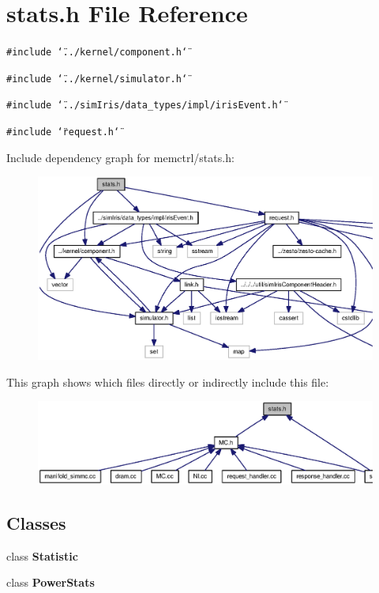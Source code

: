 \section{stats.h File Reference}
\label{memctrl_2stats_8h}
{\tt \#include \char`\"{}../kernel/component.h\char`\"{}}\par
{\tt \#include \char`\"{}../kernel/simulator.h\char`\"{}}\par
{\tt \#include \char`\"{}../simIris/data\_\-types/impl/irisEvent.h\char`\"{}}\par
{\tt \#include \char`\"{}request.h\char`\"{}}\par


Include dependency graph for memctrl/stats.h:\nopagebreak
\begin{figure}[H]
\begin{center}
\leavevmode
\includegraphics[width=420pt]{memctrl_2stats_8h__incl}
\end{center}
\end{figure}


This graph shows which files directly or indirectly include this file:\nopagebreak
\begin{figure}[H]
\begin{center}
\leavevmode
\includegraphics[width=318pt]{memctrl_2stats_8h__dep__incl}
\end{center}
\end{figure}
\subsection*{Classes}
\begin{CompactItemize}
\item 
class {\bf Statistic}
\item 
class {\bf PowerStats}
\end{CompactItemize}
